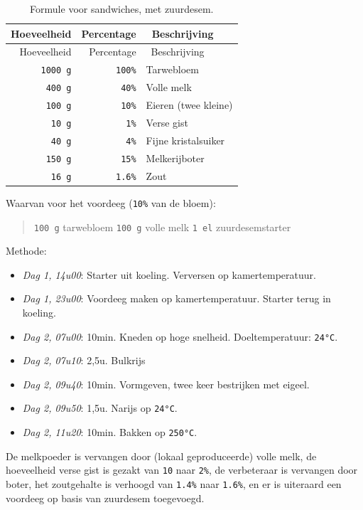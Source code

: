 \documentclass[
  11pt,
  dutch,
]{memoir}
\providecommand{\tightlist}{%
  \setlength{\itemsep}{0pt}\setlength{\parskip}{0pt}}
\begin{document}
\begin{longtable}[]{@{}rrl@{}}
\caption{Formule voor sandwiches, met zuurdesem.}\tabularnewline
\toprule
Hoeveelheid & Percentage & ~Beschrijving\tabularnewline
\midrule
\endfirsthead
\toprule
Hoeveelheid & Percentage & ~Beschrijving\tabularnewline
\midrule
\endhead
\texttt{1000\ g} & \texttt{100\%} & Tarwebloem\tabularnewline
\texttt{400\ g} & \texttt{40\%} & Volle melk\tabularnewline
\texttt{100\ g} & \texttt{10\%} & Eieren (twee kleine)\tabularnewline
\texttt{10\ g} & \texttt{1\%} & Verse gist\tabularnewline
\texttt{40\ g} & \texttt{4\%} & Fijne kristalsuiker\tabularnewline
~\texttt{150\ g} & \texttt{15\%} & Melkerijboter\tabularnewline
\texttt{16\ g} & \texttt{1.6\%} & Zout\tabularnewline
\bottomrule
\end{longtable}

Waarvan voor het voordeeg (\texttt{10\%} van de bloem):

\begin{quote}
\texttt{100\ g} tarwebloem \newline \texttt{100\ g} volle melk \newline
\texttt{1\ el} zuurdesemstarter
\end{quote}

Methode:

\begin{itemize}
\tightlist
\item
  \emph{Dag 1, 14u00}: Starter uit koeling. Verversen op
  kamertemperatuur.
\item
  \emph{Dag 1, 23u00}: Voordeeg maken op kamertemperatuur. Starter terug
  in koeling.
\item
  \emph{Dag 2, 07u00}: 10min. Kneden op hoge snelheid. Doeltemperatuur:
  \texttt{24°C}.
\item
  \emph{Dag 2, 07u10}: 2,5u. Bulkrijs
\item
  \emph{Dag 2, 09u40}: 10min. Vormgeven, twee keer bestrijken met
  eigeel.
\item
  \emph{Dag 2, 09u50}: 1,5u. Narijs op \texttt{24°C}.
\item
  \emph{Dag 2, 11u20}: 10min. Bakken op \texttt{250°C}.
\end{itemize}

De melkpoeder is vervangen door (lokaal geproduceerde) volle melk, de
hoeveelheid verse gist is gezakt van \texttt{10} naar \texttt{2\%}, de
verbeteraar is vervangen door boter, het zoutgehalte is verhoogd van
\texttt{1.4\%} naar \texttt{1.6\%}, en er is uiteraard een voordeeg op
basis van zuurdesem toegevoegd.
\end{document}
